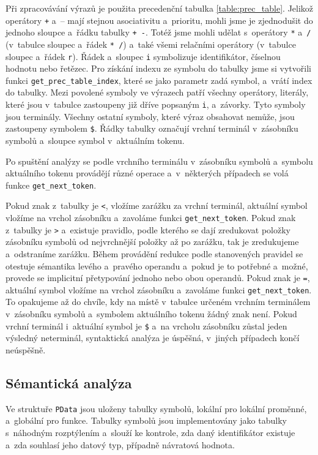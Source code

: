 \documentclass[a4paper, 11pt]{article}
\begin{document}
	Při zpracovávání výrazů je použita precedenční tabulka \ref{table:prec_table}. Jelikož operátory \texttt{+} a~– mají
	stejnou asociativitu a~prioritu, mohli jsme je zjednodušit do jednoho sloupce a~řádku tabulky \texttt{+ -}.
	Totéž jsme mohli udělat s~operátory \texttt{*} a~\texttt{/} (v~tabulce sloupec a~řádek \texttt{* /}) a~také
	všemi relačními operátory (v~tabulce sloupec a~řádek \texttt{r}). Řádek a~sloupec \texttt{i} symbolizuje
	identifikátor, číselnou hodnotu nebo řetězec. Pro získání indexu ze symbolu do tabulky jsme si vytvořili
	funkci \texttt{get\_prec\_table\_index}, které se jako parametr zadá symbol, a~vrátí index do tabulky.
	Mezi povolené symboly ve výrazech patří všechny operátory, literály, které jsou v~tabulce zastoupeny již
	dříve popsaným \texttt{i}, a~závorky. Tyto symboly jsou terminály. Všechny ostatní symboly, které výraz
	obsahovat nemůže, jsou zastoupeny symbolem \texttt{\$}. Řádky tabulky označují vrchní terminál v~zásobníku
	symbolů a~sloupce symbol v~aktuálním tokenu.

	Po spuštění analýzy se podle vrchního terminálu v~zásobníku symbolů a~symbolu aktuálního tokenu provádějí různé
	operace a~v~některých případech se volá funkce \texttt{get\_next\_token}.

	Pokud znak z~tabulky je \texttt{<}, vložíme zarážku za vrchní terminál, aktuální symbol vložíme na vrchol zásobníku
	a~zavoláme funkci \texttt{get\_next\_token}. Pokud znak z~tabulky je \texttt{>} a~existuje pravidlo, podle kterého
	se dají zredukovat položky zásobníku symbolů od nejvrchnější položky až po zarážku, tak je zredukujeme a~odstraníme
	zarážku. Během provádění redukce podle stanovených pravidel se otestuje sémantika levého a~pravého operandu a~pokud
	je to potřebné a~možné, provede se implicitní přetypování jednoho nebo obou operandů. Pokud znak je \texttt{=}, aktuální
	symbol vložíme na vrchol zásobníku a~zavoláme funkci \texttt{get\_next\_token}. To opakujeme až do chvíle, kdy na místě
	v~tabulce určeném vrchním terminálem v~zásobníku symbolů a~symbolem aktuálního tokenu žádný znak není. Pokud vrchní
	terminál i~aktuální symbol je \texttt{\$} a~na vrcholu zásobníku zůstal jeden výsledný neterminál, syntaktická analýza je
	úspěšná, v~jiných případech končí neúspěšně.


	\subsection{Sémantická analýza}

	Ve struktuře \texttt{PData} jsou uloženy tabulky symbolů, lokální pro lokální proměnné, a~globální pro funkce.
	Tabulky symbolů jsou implementovány jako tabulky s~náhodným rozptýlením a~slouží ke kontrole, zda daný
	identifikátor existuje a~zda souhlasí jeho datový typ, případně návratová hodnota.
\end{document}
